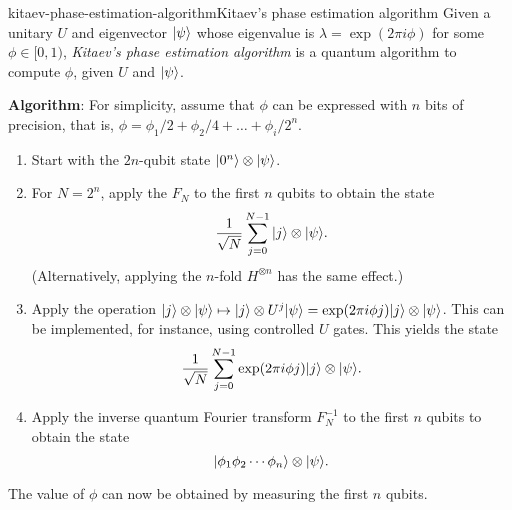 \begin{topic}{kitaev-phase-estimation-algorithm}{Kitaev's phase estimation algorithm}
    Given a unitary $U$ and eigenvector $|\psi\rangle$ whose eigenvalue is $\lambda = \exp(2 \pi i \phi)$ for some $\phi \in [0, 1)$, \emph{Kitaev's phase estimation algorithm} is a quantum algorithm to compute $\phi$, given $U$ and $|\psi\rangle$.

    \textbf{Algorithm}: For simplicity, assume that $\phi$ can be expressed with $n$ bits of precision, that is, $\phi = \phi_1 / 2 + \phi_2 / 4 + \ldots + \phi_i / 2^n$.
    \begin{enumerate}[label=(\arabic*)]
        \item Start with the $2n$-qubit state $|0^n\rangle \otimes |\psi\rangle$.
        \item For $N = 2^n$, apply the  $F_N$ to the first $n$ qubits to obtain the state
        \[ \frac{1}{\sqrt{N}} \sum_{j = 0}^{N - 1} |j\rangle \otimes |\psi\rangle . \]
        (Alternatively, applying the $n$-fold  $H^{\otimes n}$ has the same effect.)
        \item Apply the operation $|j\rangle \otimes |\psi\rangle \mapsto |j\rangle \otimes U^j |\psi\rangle = \exp(2 \pi i \phi j) |j\rangle \otimes |\psi\rangle$. This can be implemented, for instance, using controlled $U$ gates. This yields the state
        \[ \frac{1}{\sqrt{N}} \sum_{j = 0}^{N - 1} \exp(2 \pi i \phi j) |j\rangle \otimes |\psi\rangle . \]
        \item Apply the inverse quantum Fourier transform $F_N^{-1}$ to the first $n$ qubits to obtain the state
        \[ |\phi_1 \phi_2 \cdots \phi_n\rangle \otimes |\psi\rangle . \]
    \end{enumerate}
    The value of $\phi$ can now be obtained by measuring the first $n$ qubits.
\end{topic}

    

